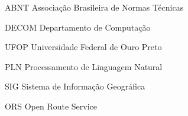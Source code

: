 \begin{siglas}
  \item[ABNT] Associação Brasileira de Normas Técnicas
  \item[DECOM] Departamento de Computação
  \item[UFOP] Universidade Federal de Ouro Preto
  \item[PLN] Processamento de Linguagem Natural
  \item[SIG] Sistema de Informação Geográfica
  \item[ORS] Open Route Service
\end{siglas}